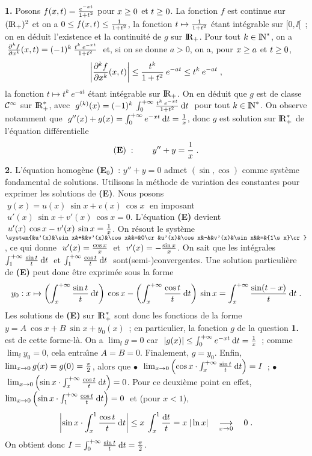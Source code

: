 \documentclass{article}
\begin{document}
{\bf 1.} Posons $f(x,t)={e^{-xt}\over1+t^2}$ pour $x\geq0$ et $t\geq0$. La fonction $f$ est continue sur $({\rm I\kern-0.6mm R}_+)^2$ et on a $0\leq f(x,t)\leq{1\over1+t^2}$, la fonction $t\mapsto{1\over1+t^2}$ \'etant int\'egrable sur $[0,\ii[$~; on en d\'eduit l'existence et la continuit\'e de $g$ sur ${\rm I\kern-0.6mm R}_+$.\msk\sect
Pour tout $k\in{\rm I\kern-0.5mm N}^*$, on a $\;{\partial^k f\over\partial x^k}(x,t)=(-1)^k\>{t^k\>e^{-xt}\over1+t^2}\;$ et, si on se donne $a>0$, on a, pour $x\geq a$ et $t\geq0$,\vv
$$\left|{\partial^k f\over\partial x^k}(x,t)\right|\leq{t^k\over1+t^2}\>e^{-at}\leq t^k\>e^{-at}\;,$$
la fonction $t\mapsto t^k\>e^{-at}$ \'etant int\'egrable sur ${\rm I\kern-0.6mm R}_+$. On en d\'eduit que $g$ est de classe ${\cal C}^{\infty}$ sur ${\rm I\kern-0.6mm R}_+^*$, avec $\;g^{(k)}(x)=(-1)^k\>\int_0^{+\infty}{t^k\>e^{-xt}\over1+t^2}\>{\rm d}t\;$ pour tout $k\in{\rm I\kern-0.5mm N}^*$.\msk\sect
On observe notamment que $\;g''(x)+g(x)=\int_0^{+\infty}e^{-xt}\>{\rm d}t={1\over x}$, donc $g$ est solution sur ${\rm I\kern-0.6mm R}_+^*$ de l'\'equation diff\'erentielle\vv
$${\bf (E)}\;:\qquad y''+y={1\over x}\;.$$
\ssk
{\bf 2.} L'\'equation homog\`ene {\bf (E}$_0${\bf)}~: $y''+y=0$ admet $(\sin,\cos)$ comme syst\`eme fondamental de solutions. Utilisons la m\'ethode de variation des constantes pour exprimer les solutions de {\bf (E)}. Nous posons $\;y(x)=u(x)\>\sin x+v(x)\>\cos x\;$ en imposant $\;u'(x)\>\sin x+v'(x)\>\cos x=0$. L'\'equation {\bf (E)} devient $\;u'(x)\>\cos x-v'(x)\>\sin x={1\over x}$.\msk\sect
On r\'esout le syst\`eme $\system{&u'(x)&\sin x&+&&v'(x)&\cos x&&=&0\cr &u'(x)&\cos x&-&&v'(x)&\sin x&&=&{1\s x}\cr}$, ce qui donne $\;u'(x)={\cos x\over x}\;$ et $\;v'(x)=-{\sin x\over x}$. On sait que les int\'egrales $\int_1^{+\infty}{\sin t\over t}\>{\rm d}t\;$ et $\int_1^{+\infty}{\cos t\over t}\>{\rm d}t\;$ sont\break (semi-)convergentes. Une solution particuli\`ere de {\bf (E)} peut donc \^etre exprim\'ee sous la forme
$$y_0:x\mapsto\left(\int_x^{+\infty}{\sin t\over t}\>{\rm d}t\right)\>\cos x-\left(\int_x^{+\infty}{\cos t\over t}\>{\rm d}t\right)\>\sin x=\int_x^{+\infty}{\sin(t-x)\over t}\>{\rm d}t\;.$$\sect
Les solutions de {\bf (E)} sur ${\rm I\kern-0.6mm R}_+^*$ sont donc les fonctions de la forme $y=A\>\cos x+B\>\sin x+y_0(x)$~; en particulier, la fonction $g$ de la question {\bf 1.} est de cette forme-l\`a. On a $\lim_{\ii}g=0$ car $\;|g(x)|\leq\int_0^{+\infty}e^{-xt}\>{\rm d}t={1\over x}$~; comme $\lim_{\ii}y_0=0$, cela entra\^\i ne $A=B=0$. Finalement, $g=y_0$.\msk\sect
Enfin, $\lim_{x\rightarrow0}g(x)=g(0)={\pi\over2}$, alors que\ssk\new
$\bullet$ $\;\lim_{x\rightarrow0}\left(\cos x\cdot\int_x^{+\infty}{\sin t\over t}\>{\rm d}t\right)=I$~;\ssk\new
$\bullet$ $\;\lim_{x\rightarrow0}\left(\sin x\cdot\int_x^{+\infty}{\cos t\over t}\>{\rm d}t\right)=0$.\msk\sect
Pour ce deuxi\`eme point en effet, $\lim_{x\rightarrow0}\left(\sin x\cdot\int_1^{+\infty}{\cos t\over t}\>{\rm d}t\right)=0\;$ et (pour $x<1$),
$$\left|\sin x\cdot\int_x^1{\cos t\s t}\>{\rm d}t\right|\ie x\>\int_x^1{{\rm d}t\s t}=x\>|\ln x|\Vers{x}{0}0\;.$$
\sect
On obtient donc $I=\int_0^{+\infty}{\sin t\over t}\>{\rm d}t={\pi\over2}$.
\end{document}
